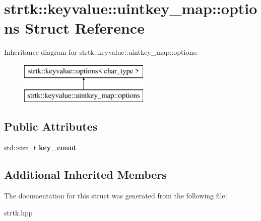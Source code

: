 \hypertarget{structstrtk_1_1keyvalue_1_1uintkey__map_1_1options}{\section{strtk\-:\-:keyvalue\-:\-:uintkey\-\_\-map\-:\-:options Struct Reference}
\label{structstrtk_1_1keyvalue_1_1uintkey__map_1_1options}
}
Inheritance diagram for strtk\-:\-:keyvalue\-:\-:uintkey\-\_\-map\-:\-:options\-:\begin{figure}[H]
\begin{center}
\leavevmode
\includegraphics[height=2.000000cm]{structstrtk_1_1keyvalue_1_1uintkey__map_1_1options}
\end{center}
\end{figure}
\subsection*{Public Attributes}
\begin{DoxyCompactItemize}
\item 
\hypertarget{structstrtk_1_1keyvalue_1_1uintkey__map_1_1options_a6fb95ce517e172538b187ffd5b410f60}{std\-::size\-\_\-t {\bfseries key\-\_\-count}}\label{structstrtk_1_1keyvalue_1_1uintkey__map_1_1options_a6fb95ce517e172538b187ffd5b410f60}

\end{DoxyCompactItemize}
\subsection*{Additional Inherited Members}


The documentation for this struct was generated from the following file\-:\begin{DoxyCompactItemize}
\item 
strtk.\-hpp\end{DoxyCompactItemize}
